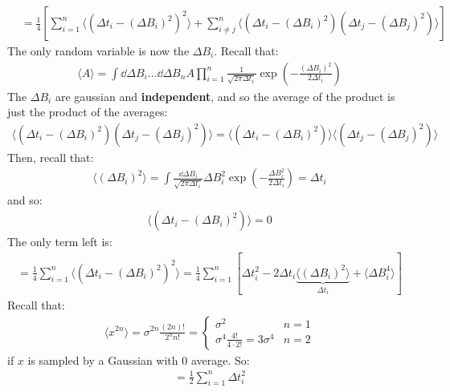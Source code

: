 \documentclass[../template.tex]{subfiles}
\begin{document}
\begin{example}[a]
    \begin{align*}
        &= \frac{1}{4} \left[ \sum_{i=1}^n \langle (\Delta t_i - (\Delta B_i)^2)^2 \rangle + \sum_{i\neq j}^n \langle (\Delta t_i - (\Delta B_i)^2) (\Delta t_j - (\Delta B_j)^2) \rangle\right]
    \end{align*}    
    The only random variable is now the $\Delta B_i$. Recall that:
    \begin{align*}
        \langle A \rangle = \int \dd{\Delta B_i} \dots \dd{\Delta B_n} A \prod_{i=1}^n \frac{1}{\sqrt{2 \pi \Delta t_i}} \exp\left(-\frac{(\Delta B_i)^2}{2 \Delta t_i} \right) 
    \end{align*} 
    The $\Delta B_i$ are gaussian and \textbf{independent}, and so the average of the product is just the product of the averages:
    \begin{align*}
        \langle (\Delta t_i - (\Delta B_i)^2) (\Delta t_j - (\Delta B_j)^2) \rangle = \langle (\Delta t_i - (\Delta B_i)^2) \rangle \langle  (\Delta t_j - (\Delta B_j)^2) \rangle
    \end{align*}  
    Then, recall that:
    \begin{align*}
        \langle (\Delta B_i)^2 \rangle = \int \frac{\dd{\Delta B_i}}{\sqrt{2 \pi \Delta t_i}} \Delta B_i^2 \exp\left(-\frac{\Delta B_i^2}{2 \Delta t_i} \right) = \Delta t_i
    \end{align*}
    and so:
    \begin{align*}
        \langle (\Delta t_i - (\Delta B_i)^2) \rangle = 0
    \end{align*}
    The only term left is:
    \begin{align*}
        = \frac{1}{4} \sum_{i=1}^n \langle ( \Delta t_i - (\Delta B_i)^2)^2 \rangle  = \frac{1}{4} \sum_{i=1}^n \left[
        \Delta t_i^2 - 2 \Delta t_i \underbrace{\langle (\Delta B_i)^2 \rangle}_{\Delta t_i}  + \langle  \Delta B_i^4 \rangle    
        \right]  
    \end{align*}
    Recall that:
    \begin{align*}
        \langle x^{2n} \rangle = \sigma^{2n} \frac{(2n)!}{2^n n!} = \begin{cases}
            \sigma^2 & n=1\\
            \sigma^4 \frac{4!}{4 \cdot 2!} = 3 \sigma ^4 & n=2 
        \end{cases}
    \end{align*}
    if $x$ is sampled by a Gaussian with $0$ average. So:
    \begin{align*}
        = \frac{1}{2} \sum_{i=1}^n \Delta t_i^2 

\end{align*}
\end{example}
\end{document}
